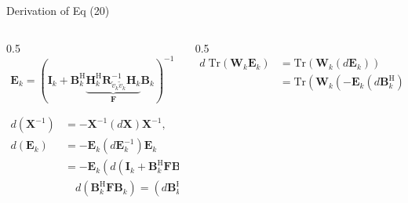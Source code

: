 \documentclass[aspectratio=169, 10pt]{beamer}
\begin{document}
\begin{frame}[label=app-wmmse-grad1]{Derivation of Eq (20)}
    \begin{columns}
        \begin{column}{0.5\paperwidth}
            \begin{equation*}
                \mathbf{E}_k = \left(\mathbf{I}_k+\mathbf{B}_k^{\mathrm{H}}
                \underbrace{
                    \mathbf{H}_k^{\mathrm{H}} \mathbf{R}_{\tilde{v}_k \tilde{v}_k}^{-1} \mathbf{H}_k }_\mathbf{F}
                \mathbf{B}_k\right)^{-1}
            \end{equation*}

            \begin{align*}
                d\left(\mathbf{X}^{-1}\right) & =-\mathbf{X}^{-1}\left(d\mathbf{X}\right)\mathbf{X}^{-1},                                                                                 \\
                d\left(\mathbf{E}_k\right)    & = -\mathbf{E}_k \left(d\mathbf{E}_k^{-1}\right)\mathbf{E}_k                                                                               \\
                                              & = -\mathbf{E}_k \left(d
                \left(
                    \mathbf{I}_k+\mathbf{B}_k^{\mathrm{H}}
                    \mathbf{F}
                    \mathbf{B}_k
                \right)\right)\mathbf{E}_k \;,                                                                                                                                            \\
                                              & \quad d\left(\mathbf{B}_k^{\mathrm{H}} \mathbf{F} \mathbf{B}_k \right) = \left(d\mathbf{B}_k^{\mathrm{H}} \right) \mathbf{F} \mathbf{B}_k
            \end{align*}
        \end{column}
        \begin{column}{0.5\paperwidth}
            \begin{align*}
                d\;\mathrm{Tr}\left(\mathbf{W}_k \mathbf{E}_k\right)
                 & = \mathrm{Tr}\left(\mathbf{W}_k \left(d\mathbf{E}_k\right)\right)                                                                                                                                                         \\
                 & = \mathrm{Tr}\left(\mathbf{W}_k \left(-\mathbf{E}_k \left(d\mathbf{B}_k^{\mathrm{H}} \right)\mathbf{F}\mathbf{B}_k\mathbf{E}_k\right)\right)                                                                              \\

\end{align*}
\end{column}
\end{columns}
\end{frame}
\end{document}
